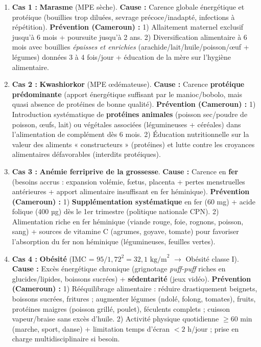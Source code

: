\documentclass[11pt]{article}
\begin{document}
\begin{corrige}
\begin{enumerate}
    \item \textbf{Cas 1 :} \textbf{Marasme} (MPE sèche). \textbf{Cause :} Carence globale énergétique et protéique (bouillies trop diluées, sevrage précoce/inadapté, infections à répétition). \textbf{Prévention (Cameroun) :} 1) Allaitement maternel exclusif jusqu'à 6 mois + poursuite jusqu'à 2 ans. 2) Diversification alimentaire à 6 mois avec bouillies \emph{épaisses et enrichies} (arachide/lait/huile/poisson/œuf + légumes) données 3 à 4 fois/jour + éducation de la mère sur l'hygiène alimentaire.
    \item \textbf{Cas 2 :} \textbf{Kwashiorkor} (MPE œdémateuse). \textbf{Cause :} Carence \textbf{protéique prédominante} (apport énergétique suffisant par le manioc/bobolo, mais quasi absence de protéines de bonne qualité). \textbf{Prévention (Cameroun) :} 1) Introduction systématique de \textbf{protéines animales} (poisson sec/poudre de poisson, œufs, lait) ou végétales associées (légumineuses + céréales) dans l'alimentation de complément dès 6 mois. 2) Éducation nutritionnelle sur la valeur des aliments « constructeurs » (protéines) et lutte contre les croyances alimentaires défavorables (interdits protéiques).
    \item \textbf{Cas 3 :} \textbf{Anémie ferriprive de la grossesse}. \textbf{Cause :} Carence en \textbf{fer} (besoins accrus : expansion volémie, fœtus, placenta + pertes menstruelles antérieures + apport alimentaire insuffisant en fer héminique). \textbf{Prévention (Cameroun) :} 1) \textbf{Supplémentation systématique} en fer (60 mg) + acide folique (400 µg) dès le 1er trimestre (politique nationale CPN). 2) Alimentation riche en fer héminique (viande rouge, foie, rognons, poisson, sang) + sources de vitamine C (agrumes, goyave, tomate) pour favoriser l'absorption du fer non héminique (légumineuses, feuilles vertes).
    \item \textbf{Cas 4 :} \textbf{Obésité} (IMC = $95 / 1,72^2 = 32,1 \text{ kg/m}^2$ $\rightarrow$ Obésité classe I). \textbf{Cause :} Excès énergétique chronique (grignotage \emph{puff-puff} riches en glucides/lipides, boissons sucrées) + \textbf{sédentarité} (jeux vidéo). \textbf{Prévention (Cameroun) :} 1) Rééquilibrage alimentaire : réduire drastiquement beignets, boissons sucrées, fritures ; augmenter légumes (ndolé, folong, tomates), fruits, protéines maigres (poisson grillé, poulet), féculents complets ; cuisson vapeur/braise sans excès d'huile. 2) Activité physique quotidienne $\ge 60$ min (marche, sport, danse) + limitation temps d'écran $< 2$ h/jour ; prise en charge multidisciplinaire si besoin.
\end{enumerate}
\end{corrige}
\end{document}
